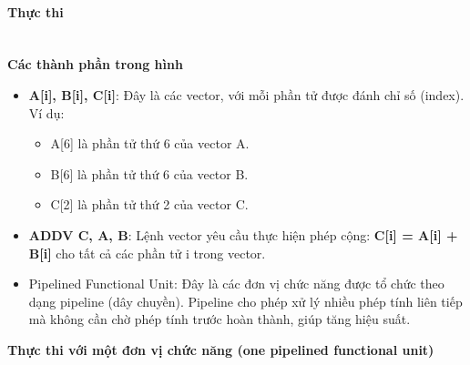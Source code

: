 \documentclass[a4paper]{article}
\begin{document}
\paragraph{Thực thi}\leavevmode\\

\textbf{Các thành phần trong hình}
\begin{itemize}
    \item \textbf{A[i], B[i], C[i]}: Đây là các vector, với mỗi phần tử được đánh chỉ số (index). Ví dụ: \par
    \begin{itemize}
        \item A[6] là phần tử thứ 6 của vector A.
        \item B[6] là phần tử thứ 6 của vector B.
        \item C[2] là phần tử thứ 2 của vector C.
    \end{itemize}
    \item \textbf{ADDV C, A, B}: Lệnh vector yêu cầu thực hiện phép cộng: \textbf{C[i] = A[i] + B[i]} cho tất cả các phần tử i trong vector.
    \item Pipelined Functional Unit: Đây là các đơn vị chức năng được tổ chức theo dạng pipeline (dây chuyền). Pipeline cho phép xử lý nhiều phép tính liên tiếp mà không cần chờ phép tính trước hoàn thành, giúp tăng hiệu suất.
\end{itemize}
\newpage
\textbf{Thực thi với một đơn vị chức năng (one pipelined functional unit)}
\end{document}
